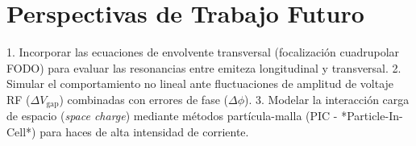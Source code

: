 \section{Perspectivas de Trabajo Futuro}
1. Incorporar las ecuaciones de envolvente transversal (focalización cuadrupolar FODO) para evaluar las resonancias entre emiteza longitudinal y transversal.
2. Simular el comportamiento no lineal ante fluctuaciones de amplitud de voltaje RF ($\Delta V_{\text{gap}}$) combinadas con errores de fase ($\Delta\phi$).
3. Modelar la interacción carga de espacio (\textit{space charge}) mediante métodos partícula-malla (PIC - *Particle-In-Cell*) para haces de alta intensidad de corriente.